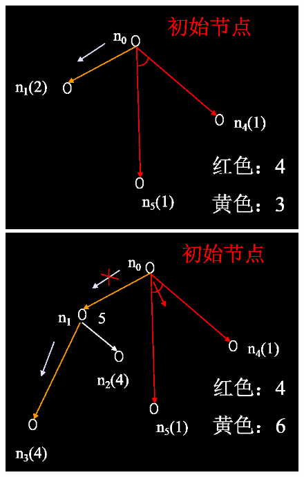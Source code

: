 \documentclass[UTF8,a4paper]{ctexart}
\begin{document}
\begin{figure}[H]
	\centering
	\includegraphics[scale = 0.15]{assets/ArtificialIntelligence_f13c1.png}
	\includegraphics[scale = 0.15]{assets/ArtificialIntelligence_72957.png}

\end{figure}
\end{document}
